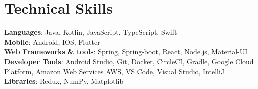 \documentclass[letterpaper,11pt]{article}
\makeatletter
\newcommand{\resumeItem}[1]{
  \item\small{
    {#1 \vspace{-2pt}}
  }
}
\newcommand{\resumeSubSubheading}[2]{
    \item
    \begin{tabular*}{0.97\textwidth}{l@{\extracolsep{\fill}}r}
      \textit{\small#1} & \textit{\small #2} \\
    \end{tabular*}\vspace{-7pt}
}
\newcommand{\resumeSubHeadingListEnd}{\end{itemize}}
\newcommand{\resumeItemListStart}{\begin{itemize}}
\newcommand{\resumeItemListEnd}{\end{itemize}\vspace{-5pt}}
\makeatother
\begin{document}

%
\section{Technical Skills}
 \begin{itemize}[leftmargin=0.15in, label={}]
    \small{\item{
     \textbf{Languages}{: Java, Kotlin, JavaScript, TypeScript, Swift} \\
     \textbf{Mobile}{: Android, IOS, Flutter} \\
     \textbf{Web Frameworks \& tools}{: Spring, Spring-boot, React, Node.js, Material-UI} \\
     \textbf{Developer Tools}{: Android Studio, Git, Docker, CircleCI, Gradle, Google Cloud Platform, Amazon Web Services AWS, VS Code, Visual Studio, IntelliJ} \\
     \textbf{Libraries}{: Redux, NumPy, Matplotlib}
    }}
 \end{itemize}


\end{document}
